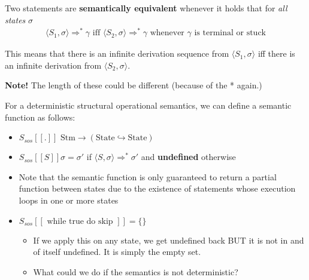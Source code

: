 \documentclass[11pt,a4paper,titlepage,dvipsnames,cmyk]{scrartcl}
\newcommand\pfun{\hookrightarrow}
\begin{document}
Two statements are \textbf{semantically equivalent} whenever it holds that
for \textit{all states} $\sigma$
\begin{align*}
    \langle S_1, \sigma \rangle \Rightarrow^* \gamma \text{ iff } \langle
    S_2, \sigma \rangle
    \Rightarrow^* \gamma \text{ whenever } \gamma \text{ is terminal or
stuck} 
\end{align*}

This means that there is an infinite derivation sequence from $\langle S_1,
\sigma \rangle$ iff there is an infinite derivation from $\langle S_2,
\sigma \rangle$.

\textbf{Note!} The length of these could be different (because of the *
again.)

For a deterministic structural operational semantics, we can define a
semantic function as follows:
\begin{itemize}
    \item $S_{sos} [[.]] \text{ Stm} \rightarrow (\text{State} \pfun
        \text{State})$
    \item $S_{sos} [[S]] \sigma = \sigma'$ if $\langle S, \sigma \rangle
        \Rightarrow^* \sigma'$ and \textbf{undefined} otherwise
    \item Note that the semantic function is only guaranteed to return a
        partial function between states due to the existence of statements
        whose execution loops in one or more states
    \item $S_{sos} [[\text{ while true do skip }]] = \{\}$
    \begin{itemize}
        \item If we apply this on any state, we get undefined back BUT it
            is not in and of itself undefined. It is simply the empty set.
        \item What could we do if the semantics is not deterministic?
\end{itemize}
\end{itemize}
\end{document}
